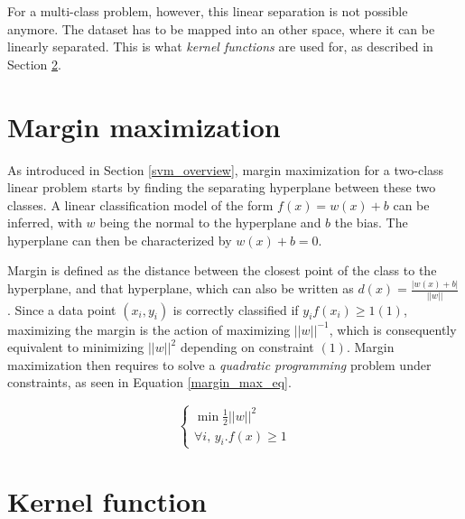 \noindent For a multi-class problem, however, this linear separation is not possible anymore. The dataset has to be mapped into an other space, where it can be linearly separated. This is what \textit{kernel functions} are used for, as described in Section \ref{kernel_fct}.
\newline

\section{Margin maximization}
\label{margin_max}

\vspace{\baselineskip}
\noindent As introduced in Section \ref{svm_overview}, margin maximization for a two-class linear problem starts by finding the separating hyperplane between these two classes. A linear classification model of the form $f(x) = w(x) + b$ can be inferred, with $w$ being the normal to the hyperplane and $b$ the bias. The hyperplane can then be characterized by  $w(x) + b = 0$.
\newline

\noindent Margin is defined as the distance between the closest point of the class to the hyperplane, and that hyperplane, which can also be written as $ d(x) = \frac{|w(x) + b |}{||w||}$. Since a data point $(x_i, y_i)$ is correctly classified if $y_if(x_i) \geq 1 (1)$, maximizing the margin is the action of maximizing $||w||^{-1}$, which is consequently equivalent to minimizing $||w||^2$ depending on constraint $(1)$. Margin maximization then requires to solve a \textit{quadratic programming} problem under constraints, as seen in Equation \ref{margin_max_eq}.

\begin{equation}
\left\{
\begin{array}{l}
\min \frac{1}{2} ||w||^2 \\
\forall i, \, y_i . f(x) \geq 1
\end{array}
\right.
\label{margin_max_eq}
\end{equation}


\vspace{\baselineskip}

\section{Kernel function}
\label{kernel_fct}

